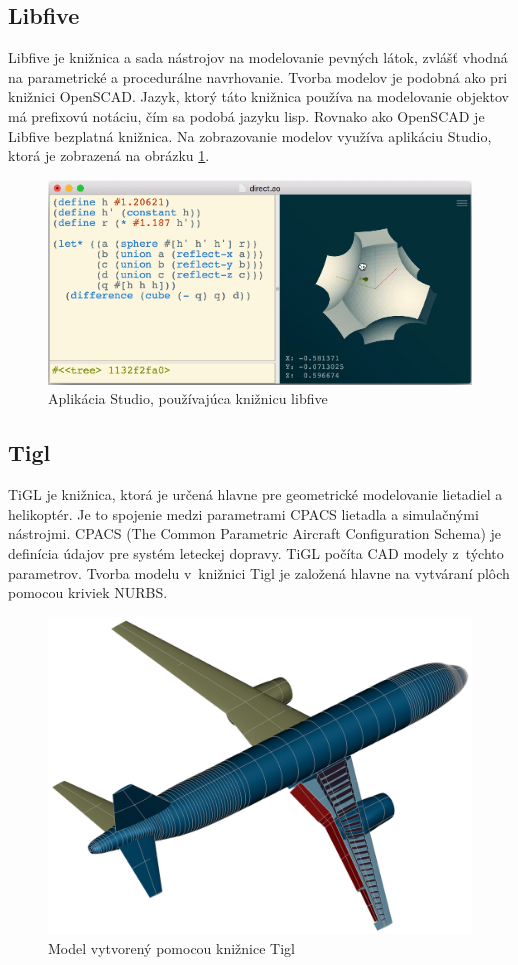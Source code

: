 \subsection*{Libfive}
Libfive je knižnica  a sada nástrojov na modelovanie pevných látok, zvlášť vhodná na parametrické a procedurálne navrhovanie. Tvorba modelov je podobná ako pri knižnici OpenSCAD. Jazyk, ktorý táto knižnica používa na modelovanie objektov má prefixovú notáciu, čím sa podobá jazyku lisp. Rovnako ako OpenSCAD je Libfive bezplatná  knižnica. Na zobrazovanie modelov využíva aplikáciu Studio, ktorá je zobrazená na obrázku \ref{fig:LibfiveStudio}. \cite{}\nopagebreak
\begin{figure}[H]
    \centering
    \includegraphics[width = 0.9\linewidth]{obrazky-figures/programs/libfive.png}
    \caption{Aplikácia Studio, používajúca knižnicu libfive \cite{} }
    \label{fig:LibfiveStudio}
\end{figure}


\subsection*{Tigl}
TiGL je knižnica, ktorá je určená hlavne pre geometrické modelovanie lietadiel a helikoptér. 
Je to spojenie medzi parametrami CPACS lietadla a simulačnými nástrojmi. 
CPACS (The Common Parametric Aircraft Configuration Schema) je definícia údajov pre systém leteckej dopravy. TiGL počíta CAD modely z~týchto parametrov.
Tvorba modelu v~knižnici Tigl je založená hlavne na vytváraní plôch pomocou kriviek NURBS. \cite{}\nopagebreak
\begin{figure}[H]
    \centering
    \includegraphics[width = 0.5\linewidth]{obrazky-figures/programs/tigl.png}
    \caption{Model vytvorený pomocou knižnice Tigl \cite{} }
    \label{fig:Tigl}
\end{figure}

